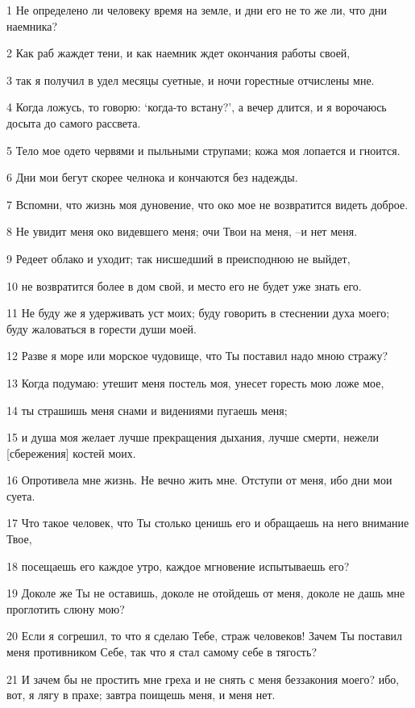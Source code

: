 \par 1 Не определено ли человеку время на земле, и дни его не то же ли, что дни наемника?
\par 2 Как раб жаждет тени, и как наемник ждет окончания работы своей,
\par 3 так я получил в удел месяцы суетные, и ночи горестные отчислены мне.
\par 4 Когда ложусь, то говорю: `когда-то встану?', а вечер длится, и я ворочаюсь досыта до самого рассвета.
\par 5 Тело мое одето червями и пыльными струпами; кожа моя лопается и гноится.
\par 6 Дни мои бегут скорее челнока и кончаются без надежды.
\par 7 Вспомни, что жизнь моя дуновение, что око мое не возвратится видеть доброе.
\par 8 Не увидит меня око видевшего меня; очи Твои на меня, --и нет меня.
\par 9 Редеет облако и уходит; так нисшедший в преисподнюю не выйдет,
\par 10 не возвратится более в дом свой, и место его не будет уже знать его.
\par 11 Не буду же я удерживать уст моих; буду говорить в стеснении духа моего; буду жаловаться в горести души моей.
\par 12 Разве я море или морское чудовище, что Ты поставил надо мною стражу?
\par 13 Когда подумаю: утешит меня постель моя, унесет горесть мою ложе мое,
\par 14 ты страшишь меня снами и видениями пугаешь меня;
\par 15 и душа моя желает лучше прекращения дыхания, лучше смерти, нежели [сбережения] костей моих.
\par 16 Опротивела мне жизнь. Не вечно жить мне. Отступи от меня, ибо дни мои суета.
\par 17 Что такое человек, что Ты столько ценишь его и обращаешь на него внимание Твое,
\par 18 посещаешь его каждое утро, каждое мгновение испытываешь его?
\par 19 Доколе же Ты не оставишь, доколе не отойдешь от меня, доколе не дашь мне проглотить слюну мою?
\par 20 Если я согрешил, то что я сделаю Тебе, страж человеков! Зачем Ты поставил меня противником Себе, так что я стал самому себе в тягость?
\par 21 И зачем бы не простить мне греха и не снять с меня беззакония моего? ибо, вот, я лягу в прахе; завтра поищешь меня, и меня нет.

